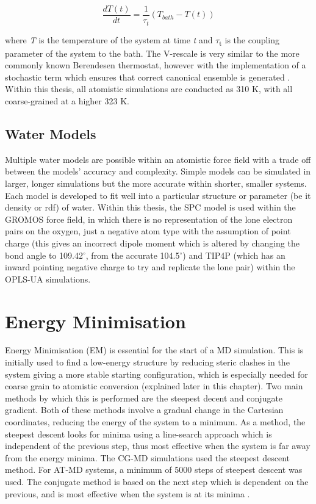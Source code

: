 \begin{equation}
\frac{dT(t)}{dt} = \frac{1}{\tau_{t}}(T_{bath} - T (t))
\label{eq:berdendsen2}
\end{equation}

where \textit{T} is the temperature of the system at time \textit{t} and $\tau$\textsubscript{t} is the coupling parameter of the system to the bath. The V-rescale is very similar to the more commonly known Berendesen thermostat, however with the implementation of a stochastic term which ensures that correct canonical ensemble is generated \cite{Apol2013}. Within this thesis, all atomistic simulations are conducted as 310 K, with all coarse-grained at a higher 323 K.

\subsection{Water Models}

Multiple water models are possible within an atomistic force field \cite{Chaplin2001} with a trade off between the models' accuracy and complexity. Simple models can be simulated in larger, longer simulations but the more accurate within shorter, smaller systems. Each model is developed to fit well into a particular structure or parameter (be it density or rdf) of water. Within this thesis, the SPC model \cite{Berendsen1987a} is used within the GROMOS force field, in which there is no representation of the lone electron pairs on the oxygen, just a negative atom type with the assumption of point charge (this gives an incorrect dipole moment which is altered by changing the bond angle to 109.42$^\circ$, from the accurate 104.5$^\circ$) and TIP4P \cite{Jorgensen1983} (which has an inward pointing negative charge to try and replicate the lone pair) within the OPLS-UA simulations. 

\section{Energy Minimisation}
Energy Minimisation (EM) is essential  for the start of a MD simulation. This is initially used to find a low-energy structure by reducing steric clashes in the system giving a more stable starting configuration, which is especially needed for coarse grain to atomistic conversion (explained later in this chapter). Two main methods by which this is performed are the steepest decent and conjugate gradient. Both of these methods involve a gradual change in the Cartesian coordinates, reducing the energy of the system to a minimum. As a method, the steepest descent looks for minima using a line-search approach which is independent of the previous step, thus most effective when the system is far away from the energy minima. The CG-MD simulations used the steepest descent method. For AT-MD systems, a minimum of 5000 steps of steepest descent was used. The conjugate method is based on the next step which is dependent on the previous, and is most effective when the system is at its minima \cite{Leach2001}. 


